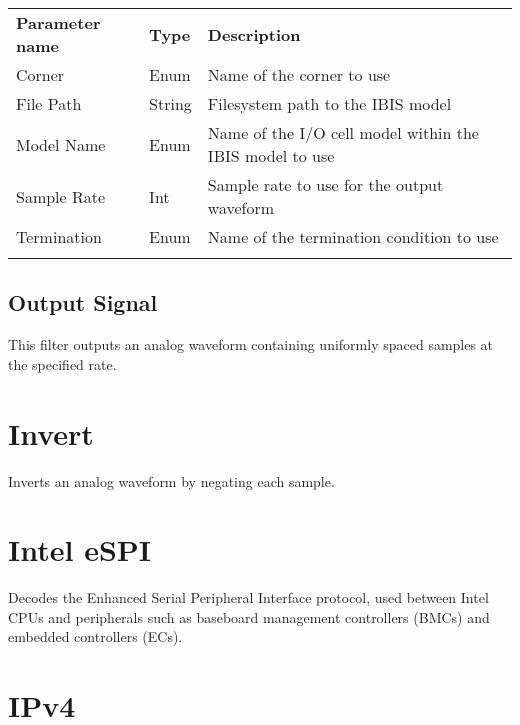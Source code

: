 \begin{tabularx}{16cm}{llX}
\thickhline
\textbf{Parameter name} & \textbf{Type} & \textbf{Description} \\
\thickhline
Corner & Enum & Name of the corner to use\\
\thinhline
File Path & String & Filesystem path to the IBIS model\\
\thinhline
Model Name & Enum & Name of the I/O cell model within the IBIS model to use\\
\thinhline
Sample Rate & Int & Sample rate to use for the output waveform\\
\thinhline
Termination & Enum & Name of the termination condition to use\\
\thickhline
\end{tabularx}

\subsection{Output Signal}

This filter outputs an analog waveform containing uniformly spaced samples at the specified rate.

\pagebreak
\section{Invert}
\label{filter:invert}

Inverts an analog waveform by negating each sample.

\pagebreak
\section{Intel eSPI}

Decodes the Enhanced Serial Peripheral Interface protocol, used between Intel CPUs and peripherals such as baseboard
management controllers (BMCs) and embedded controllers (ECs).

\pagebreak
\section{IPv4}

